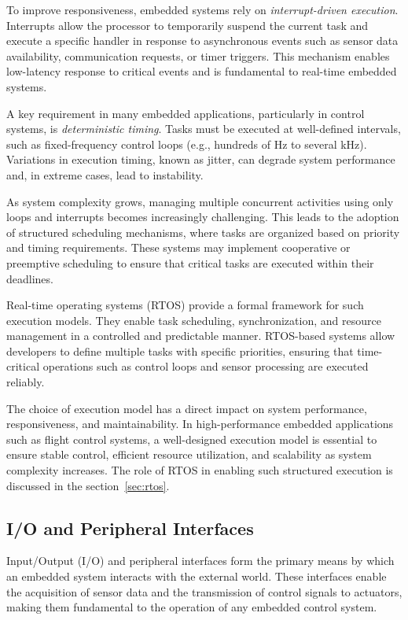To improve responsiveness, embedded systems rely on \textit{interrupt-driven execution}. Interrupts allow the processor to temporarily suspend the current task and execute a specific handler in response to asynchronous events such as sensor data availability, communication requests, or timer triggers. This mechanism enables low-latency response to critical events and is fundamental to real-time embedded systems.

A key requirement in many embedded applications, particularly in control systems, is \textit{deterministic timing}. Tasks must be executed at well-defined intervals, such as fixed-frequency control loops (e.g., hundreds of Hz to several kHz). Variations in execution timing, known as jitter, can degrade system performance and, in extreme cases, lead to instability.

As system complexity grows, managing multiple concurrent activities using only loops and interrupts becomes increasingly challenging. This leads to the adoption of structured scheduling mechanisms, where tasks are organized based on priority and timing requirements. These systems may implement cooperative or preemptive scheduling to ensure that critical tasks are executed within their deadlines.

Real-time operating systems (RTOS) provide a formal framework for such execution models. They enable task scheduling, synchronization, and resource management in a controlled and predictable manner. RTOS-based systems allow developers to define multiple tasks with specific priorities, ensuring that time-critical operations such as control loops and sensor processing are executed reliably.

The choice of execution model has a direct impact on system performance, responsiveness, and maintainability. In high-performance embedded applications such as flight control systems, a well-designed execution model is essential to ensure stable control, efficient resource utilization, and scalability as system complexity increases. The role of RTOS in enabling such structured execution is discussed in the section~\ref{sec:rtos}.

\subsection{I/O and Peripheral Interfaces}

Input/Output (I/O) and peripheral interfaces form the primary means by which an embedded system interacts with the external world. These interfaces enable the acquisition of sensor data and the transmission of control signals to actuators, making them fundamental to the operation of any embedded control system.

